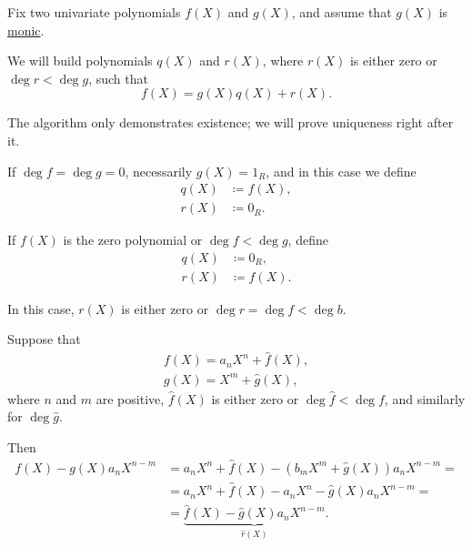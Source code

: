 \begin{algorithm}\label{alg:euclidean_division_of_polynomials}
  Fix two univariate polynomials \( f(X) \) and \( g(X) \), and assume that \( g(X) \) is \hyperref[def:monic_polynomial]{monic}.

  We will build polynomials \( q(X) \) and \( r(X) \), where \( r(X) \) is either zero or \( \deg r < \deg g \), such that
  \begin{equation*}
    f(X) = g(X) q(X) + r(X).
  \end{equation*}

  The algorithm only demonstrates existence; we will prove uniqueness right after it.

  \begin{thmenum}
     If \( \deg f = \deg g = 0 \), necessarily \( g(X) = 1_R \), and in this case we define
    \begin{align*}
      q(X) &\coloneqq f(X), \\
      r(X) &\coloneqq 0_R.
    \end{align*}

     If \( f(X) \) is the zero polynomial or \( \deg f < \deg g \), define
    \begin{align*}
      q(X) &\coloneqq 0_R, \\
      r(X) &\coloneqq f(X).
    \end{align*}

    In this case, \( r(X) \) is either zero or \( \deg r = \deg f < \deg b \).

     Suppose that
    \begin{align*}
      f(X) = a_n X^n + \hat f(X), \\
      g(X) = X^m + \hat g(X),
    \end{align*}
    where \( n \) and \( m \) are positive, \( \hat f(X) \) is either zero or \( \deg \hat f < \deg f \), and similarly for \( \deg \hat g \).

    Then
    \begin{align*}
    f(X) - g(X) a_n X^{n-m}
    &=
    a_n X^n + \hat f(X) - (b_m X^m + \hat g(X)) a_n X^{n-m}
    = \\ &=
    a_n X^n + \hat f(X) - a_n X^n - \hat g(X) a_n X^{n-m}
    = \\ &=
    \underbrace{\hat f(X) - \hat g(X) a_n X^{n-m}}_{\hat r(X)}.
    \end{align*}


\end{thmenum}
\end{algorithm}
